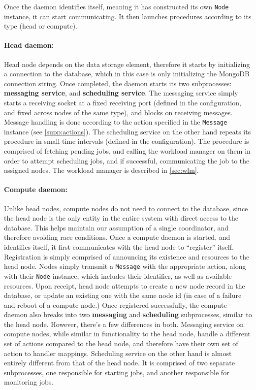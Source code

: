 \documentclass[sigconf]{acmart}
\begin{document}
Once the daemon identifies itself, meaning it has constructed its own \verb|Node| instance, it can start communicating.
It then launches procedures according to its type (head or compute).

\paragraph{Head daemon:}
Head node depends on the data storage element, therefore it starts by initializing a connection to the database, which in this
case is only initializing the MongoDB connection string.
Once completed, the daemon starts its two subprocesses: \textbf{messaging service}, and \textbf{scheduling service}.
The messaging service simply starts a receiving socket at a fixed receiving port (defined in the configuration, and fixed across
nodes of the same type), and blocks on receiving messages.
Message handling is done according to the action specified in the \verb|Message| instance (see \cref{supp:actions}).
The scheduling service on the other hand repeats its procedure in small time intervals (defined in the configuration). The
procedure is comprised of fetching pending jobs, and calling the workload manager on them in order to attempt scheduling jobs,
and if successful, communicating the job to the assigned nodes.
The workload manager is described in \cref{sec:wlm}.

\paragraph{Compute daemon:}
Unlike head nodes, compute nodes do not need to connect to the database, since the head node is the only entity in the entire
system with direct access to the database. This helps maintain our assumption of a single coordinator, and therefore avoiding
race conditions.
Once a compute daemon is started, and identifies itself, it first communicates with the head node to ``register'' itself.
Registration is simply comprised of announcing its existence and resources to the head node.
Nodes simply transmit a \verb|Message| with the appropriate action, along with their \verb|Node| instance, which includes their
identifier, as well as available resources.
Upon receipt, head node attempts to create a new node record in the database, or update an existing one with the same node id
(in case of a failure and reboot of a compute node.)
Once registered successfully, the compute daemon also breaks into two \textbf{messaging} and \textbf{scheduling} subprocesses,
similar to the head node. However, there's a few differences in both.
Messaging service on compute nodes, while similar in functionality to the head node, handle a different set of actions compared
to the head node, and therefore have their own set of action to handler mappings.
Scheduling service on the other hand is almost entirely different from that of the head node.
It is comprised of two separate subprocesses, one responsible for starting jobs, and another responsible for monitoring jobs.
\end{document}
